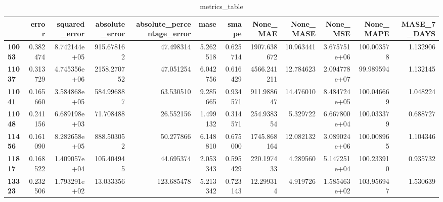 \begin{table}[h]
\centering
\caption{metrics_table}
\label{table:PRedict low-variance dataset with lstm}
\begin{tabular}{lrrrrrrrrrrr}
\toprule
{} &     error &  squared\_error &  absolute\_error &  absolute\_percentage\_error &      mase &     smape &     None\_MAE &  None\_MASE &      None\_MSE &   None\_MAPE &  MASE\_7\_DAYS \\
\midrule
\textbf{10053} &  0.382474 &   8.742144e+05 &      915.678162 &                  47.498314 &  5.262518 &  0.625714 &  1907.638672 &  10.963441 &  3.675751e+06 &  100.003578 &     1.132906 \\
\textbf{11037} &  0.313729 &   4.745356e+06 &     2158.270752 &                  47.051254 &  6.042756 &  0.616429 &  4566.241211 &  12.784623 &  2.094778e+07 &   99.989594 &     1.132145 \\
\textbf{11041} &  0.165660 &   3.584868e+05 &      584.996887 &                  63.530510 &  9.285665 &  0.934571 &   911.988647 &  14.476010 &  8.484724e+05 &  100.046669 &     1.048224 \\
\textbf{11048} &  0.241156 &   6.689198e+03 &       71.708488 &                  26.552156 &  1.499132 &  0.314571 &   254.938354 &   5.329722 &  6.667800e+04 &  100.033379 &     0.688727 \\
\textbf{11456} &  0.161090 &   8.282658e+05 &      888.503052 &                  50.277866 &  6.148810 &  0.675000 &  1745.868164 &  12.082132 &  3.089024e+06 &  100.008965 &     1.104346 \\
\textbf{11817} &  0.168522 &   1.409057e+04 &      105.404945 &                  44.695374 &  2.053343 &  0.595429 &   220.197433 &   4.289560 &  5.147251e+04 &  100.233910 &     0.935732 \\
\textbf{13323} &  0.232506 &   1.793291e+02 &       13.033356 &                 123.685478 &  5.213342 &  0.723143 &    12.299314 &   4.919726 &  1.585463e+02 &  103.956947 &     1.530639 \\
\bottomrule
\end{tabular}
\end{table}
